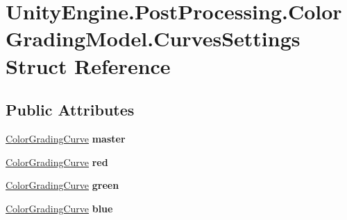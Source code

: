 \hypertarget{struct_unity_engine_1_1_post_processing_1_1_color_grading_model_1_1_curves_settings}{}\section{Unity\+Engine.\+Post\+Processing.\+Color\+Grading\+Model.\+Curves\+Settings Struct Reference}
\label{struct_unity_engine_1_1_post_processing_1_1_color_grading_model_1_1_curves_settings}
\subsection*{Public Attributes}
\begin{DoxyCompactItemize}
\item 
\mbox{\label{struct_unity_engine_1_1_post_processing_1_1_color_grading_model_1_1_curves_settings_a45b722d6b5f693200b00c3b5afa10c08}} 
\hyperlink{class_unity_engine_1_1_post_processing_1_1_color_grading_curve}{Color\+Grading\+Curve} {\bfseries master}
\item 
\mbox{\label{struct_unity_engine_1_1_post_processing_1_1_color_grading_model_1_1_curves_settings_a5eed66ba3015ad1f29f2ac50b7c24d97}} 
\hyperlink{class_unity_engine_1_1_post_processing_1_1_color_grading_curve}{Color\+Grading\+Curve} {\bfseries red}
\item 
\mbox{\label{struct_unity_engine_1_1_post_processing_1_1_color_grading_model_1_1_curves_settings_ae071b879ff13830f57d36808aa95b962}} 
\hyperlink{class_unity_engine_1_1_post_processing_1_1_color_grading_curve}{Color\+Grading\+Curve} {\bfseries green}
\item 
\mbox{\label{struct_unity_engine_1_1_post_processing_1_1_color_grading_model_1_1_curves_settings_ab803f67e4fdea7436c5dd6b41c21b86f}} 
\hyperlink{class_unity_engine_1_1_post_processing_1_1_color_grading_curve}{Color\+Grading\+Curve} {\bfseries blue}
\item 

\end{DoxyCompactItemize}
